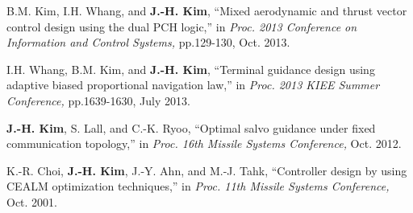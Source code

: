 \documentclass[margin,line]{res}
\begin{document}
\begin{resume}
B.M. Kim, I.H. Whang, and {\bf J.-H. Kim}, ``Mixed aerodynamic and thrust vector control design using the dual PCH logic,'' in \emph{Proc. 2013 Conference on Information and Control Systems,} pp.129-130, Oct. 2013.

I.H. Whang, B.M. Kim, and {\bf J.-H. Kim}, ``Terminal guidance design using adaptive biased proportional navigation law,'' in \emph{Proc. 2013 KIEE Summer Conference,} pp.1639-1630, July 2013.

{\bf J.-H. Kim}, S. Lall, and C.-K. Ryoo, ``Optimal salvo guidance under fixed communication topology,'' in \emph{Proc. 16th Missile Systems Conference,} Oct. 2012. 

K.-R. Choi, {\bf J.-H. Kim}, J.-Y. Ahn, and M.-J. Tahk, ``Controller design by using CEALM optimization  techniques,'' in \emph{Proc. 11th Missile Systems Conference,} Oct. 2001.

\end{resume}
\end{document}
